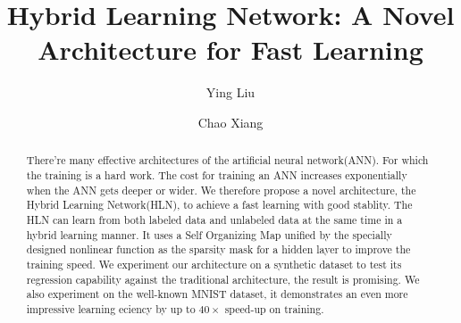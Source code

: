 \documentclass[3p,times,procedia]{elsarticle}
\begin{document}
\begin{frontmatter}




\title{Hybrid Learning Network: 
	A Novel Architecture for
	Fast Learning}


\author[u1,u2]{Ying Liu}
\author[u1]{Chao Xiang}

\address[u1]{School of Computer 
	and Engineering, University of 
	Chinese Academy of Sciences, 
	Beijing, 100190 China}
\address[u2]{Key Lab of Big Data
	Mining and Knowledge Management,
	Chinese Academy of Sciences,
	Beijing, 100190 China}

\begin{abstract}
There're many effective architectures 
of the artificial neural network(ANN).
For which the training is a hard work.
The cost for training an ANN increases
exponentially when the ANN gets deeper 
or wider. 
We therefore propose a novel 
architecture, the Hybrid Learning
Network(HLN), to achieve a fast learning 
with good stablity.
The HLN can learn from both
labeled data and unlabeled data
at the same time in a hybrid
learning manner.
It uses a Self Organizing Map unified
by the specially designed nonlinear
function as the sparsity mask 
for a hidden layer to improve 
the training speed.
We experiment our architecture on 
a synthetic dataset to test its 
regression capability against the
traditional architecture, the result 
is promising.
We also experiment on the well-known
MNIST dataset, it demonstrates an 
even more impressive learning eciency 
by up to $40\times$ speed-up on training.
\end{abstract}


\end{frontmatter}
\end{document}
